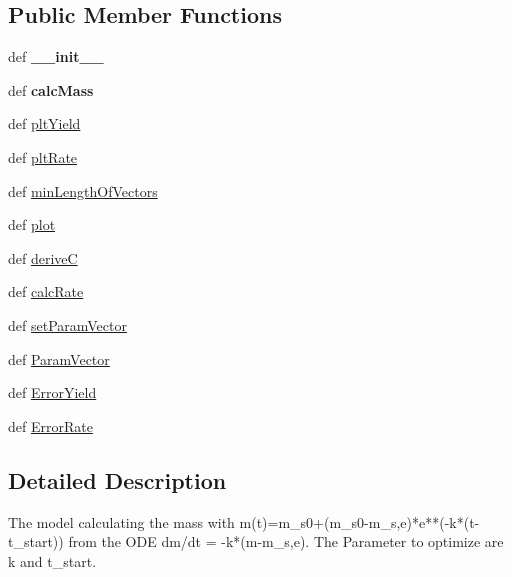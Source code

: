 \subsection*{\-Public \-Member \-Functions}
\begin{DoxyCompactItemize}
\item 
\hypertarget{classFit__one__run_1_1ConstantRateModel_a84c0d6f00d5e12e46e96ec406c4da10b}{def {\bfseries \-\_\-\-\_\-init\-\_\-\-\_\-}}\label{classFit__one__run_1_1ConstantRateModel_a84c0d6f00d5e12e46e96ec406c4da10b}

\item 
\hypertarget{classFit__one__run_1_1ConstantRateModel_aea8329a6ea8bb58312eeac92fa36ea28}{def {\bfseries calc\-Mass}}\label{classFit__one__run_1_1ConstantRateModel_aea8329a6ea8bb58312eeac92fa36ea28}

\item 
def \hyperlink{classFit__one__run_1_1Model_aa304b32155938a713c33f0dc03a135f3}{plt\-Yield}
\item 
def \hyperlink{classFit__one__run_1_1Model_a9c28d95902adf00f5aaa642f0919fc61}{plt\-Rate}
\item 
def \hyperlink{classFit__one__run_1_1Model_a26fc879ca33c9171ebb4a97bc4b0c46b}{min\-Length\-Of\-Vectors}
\item 
def \hyperlink{classFit__one__run_1_1Model_a98159c954f1f1be2a34be3ea53d11493}{plot}
\item 
def \hyperlink{classFit__one__run_1_1Model_ace9df4177c5ae753dbe190e2f8268149}{derive\-C}
\item 
def \hyperlink{classFit__one__run_1_1Model_a07ae4534de2a6ef241d71facdffb227e}{calc\-Rate}
\item 
def \hyperlink{classFit__one__run_1_1Model_a174aec9b05dbe01ec103f7ba75d6516c}{set\-Param\-Vector}
\item 
def \hyperlink{classFit__one__run_1_1Model_a3c9239f0ac062fdae0bda395636c0372}{\-Param\-Vector}
\item 
def \hyperlink{classFit__one__run_1_1Model_aa2bc4ba19704350fb2ff441734b51b10}{\-Error\-Yield}
\item 
def \hyperlink{classFit__one__run_1_1Model_aad63c345c343f0c7d1cf20135dc0a0e5}{\-Error\-Rate}
\end{DoxyCompactItemize}


\subsection{\-Detailed \-Description}
\begin{DoxyVerb}The model calculating the mass with m(t)=m_s0+(m_s0-m_s,e)*e**(-k*(t-t_start)) from the ODE dm/dt = -k*(m-m_s,e). The Parameter to optimize are k and t_start.\end{DoxyVerb}
 

